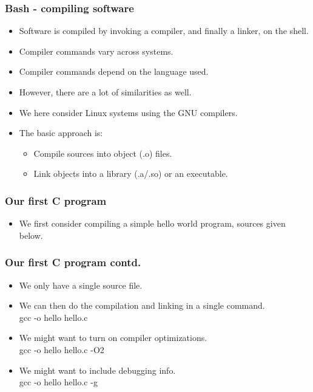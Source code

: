 \documentclass{beamer}
\begin{document}
\begin{frame}\frametitle{Bash - compiling software}
  \begin{itemize}
    \item Software is compiled by invoking a compiler, and finally a linker, on the shell.
    \item Compiler commands vary across systems.
    \item Compiler commands depend on the language used.
    \item However, there are a lot of similarities as well.
    \item We here consider Linux systems using the GNU compilers.
    \item The basic approach is:
      \begin{itemize}
        \item Compile sources into object (.o) files.
        \item Link objects into a library (.a/.so) or an executable.
      \end{itemize}
  \end{itemize}
\end{frame}

\begin{frame}\frametitle{Our first C program}
  \begin{itemize}
    \item We first consider compiling a simple hello world program, sources given below.
      
  \end{itemize}
\end{frame}

\begin{frame}\frametitle{Our first C program contd.}
  \begin{itemize}
    \item We only have a single source file.
    \item We can then do the compilation and linking in a single command. \\
      gcc -o hello hello.c
    \item We might want to turn on compiler optimizations. \\
      gcc -o hello hello.c -O2
    \item We might want to include debugging info. \\
      gcc -o hello hello.c -g
  \end{itemize}
\end{frame}
\end{document}
